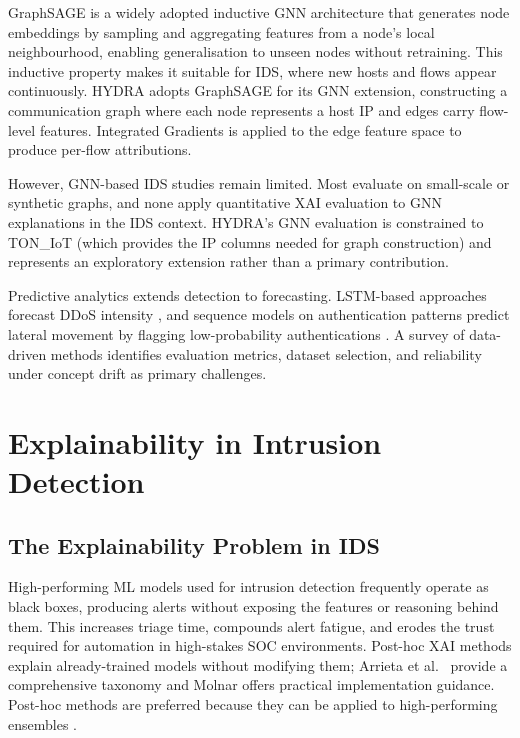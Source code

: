 \documentclass[12pt,a4paper]{report}
\begin{document}
GraphSAGE \cite{hamilton2017} is a widely adopted inductive GNN architecture that generates node embeddings by sampling and aggregating features from a node's local neighbourhood, enabling generalisation to unseen nodes without retraining. This inductive property makes it suitable for IDS, where new hosts and flows appear continuously. HYDRA adopts GraphSAGE for its GNN extension, constructing a communication graph where each node represents a host IP and edges carry flow-level features. Integrated Gradients is applied to the edge feature space to produce per-flow attributions.

However, GNN-based IDS studies remain limited. Most evaluate on small-scale or synthetic graphs, and none apply quantitative XAI evaluation to GNN explanations in the IDS context. HYDRA's GNN evaluation is constrained to TON\_IoT (which provides the IP columns needed for graph construction) and represents an exploratory extension rather than a primary contribution.

Predictive analytics extends detection to forecasting. LSTM-based approaches forecast DDoS intensity \cite{kong2025}, and sequence models on authentication patterns predict lateral movement by flagging low-probability authentications \cite{turcotte2018}. A survey of data-driven methods \cite{chou2021} identifies evaluation metrics, dataset selection, and reliability under concept drift as primary challenges.

\section{Explainability in Intrusion Detection}
\label{sec:xai}

\subsection{The Explainability Problem in IDS}
\label{sec:xai-problem}

High-performing ML models used for intrusion detection frequently operate as black boxes, producing alerts without exposing the features or reasoning behind them. This increases triage time, compounds alert fatigue, and erodes the trust required for automation in high-stakes SOC environments. Post-hoc XAI methods explain already-trained models without modifying them; Arrieta et al.\ \cite{arrieta2020} provide a comprehensive taxonomy and Molnar \cite{molnar2022} offers practical implementation guidance. Post-hoc methods are preferred because they can be applied to high-performing ensembles \cite{adadi2018}.
\end{document}
